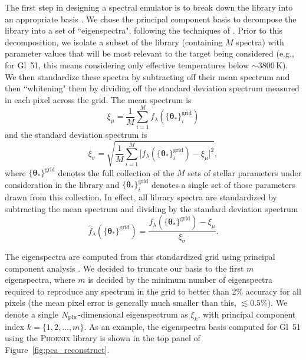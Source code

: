 \documentclass[iop,floatfix,numberedappendix,twocolappendix]{emulateapj}
\newcommand{\vt}{ {\bm \theta}}
\begin{document}
The first step in designing a spectral emulator is to break down the library into an appropriate 
basis \citep{habib07, heitmann09}.  We chose the principal component basis to decompose the library 
into a set of ``eigenspectra", following the techniques of \citet{ivezic13}.  Prior to this 
decomposition, we isolate a subset of the library (containing $M$ spectra) with parameter values 
that will be most relevant to the target being considered (e.g., for Gl~51, this means considering 
only effective temperatures below $\sim$3800\,K).  We then standardize these spectra by subtracting 
off their mean spectrum and then ``whitening" them by dividing off the standard deviation spectrum 
measured in each pixel across the grid.  The mean spectrum is 
\begin{equation}
  \xi_\mu = \frac{1}{M} \sum_{i = 1}^M f_\lambda(\{\vt_\ast \}^\textrm{grid}_i)
\end{equation}
and the standard deviation spectrum is
\begin{equation}
  \xi_\sigma = \sqrt{\frac{1}{M} \sum_{i=1}^M \bigl [ f_\lambda(\{\vt_\ast \}^\textrm{grid}_i) - \xi_\mu \bigr]^2 }, 
\end{equation}
where $\{\vt_\ast \}^\textrm{grid}$ denotes the full collection of the $M$ sets of stellar 
parameters under consideration in the library and $\{\vt_\ast \}^\textrm{grid}_i$ denotes a single 
set of those parameters drawn from this collection.  In effect, all library spectra are 
standardized by subtracting the mean spectrum and dividing by the standard deviation spectrum
\begin{equation}
  \hat{f}_\lambda(\{\vt_\ast \}^\textrm{grid}) = \frac{f_\lambda(\{\vt_\ast \}^\textrm{grid}) - \xi_\mu}{\xi_\sigma}.
\end{equation}

The eigenspectra are computed from this standardized grid using principal component analysis 
\citep[PCA;][]{ivezic13}.  We decided to truncate our basis to the first $m$ eigenspectra, where 
$m$ is decided by the minimum number of eigenspectra required to reproduce any spectrum in the grid 
to better than 2\% accuracy for all pixels (the mean pixel error is generally much smaller than 
this, $\lesssim 0.5\%$).  We denote a single $N_{\rm pix}$-dimensional eigenspectrum as $\xi_k$, 
with principal component index $k = \{1, 2, \ldots, m\}$.  As an example, the eigenspectra basis 
computed for Gl~51 using the \textsc{Phoenix} library is shown in the top panel of 
Figure~\ref{fig:pca_reconstruct}.
\end{document}

